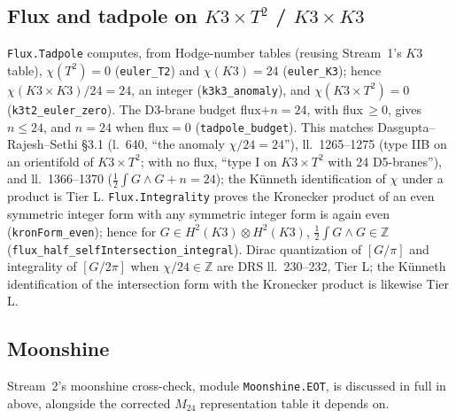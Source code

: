 \documentclass[11pt,a4paper]{article}
\theoremstyle{remark}
\begin{document}
\subsection{Flux and tadpole on \texorpdfstring{$K3\times T^2$}{K3xT2} / \texorpdfstring{$K3\times K3$}{K3xK3}}
\label{sec:stream2-flux}
\texttt{Flux.Tadpole} computes, from Hodge-number tables (reusing Stream~1's $K3$ table),
$\chi(T^2)=0$ (\texttt{euler\_\discretionary{}{}{}T2}) and $\chi(K3)=24$
(\texttt{euler\_\discretionary{}{}{}K3}); hence $\chi(K3\times K3)/24=24$, an integer
(\texttt{k3k3\_\discretionary{}{}{}anomaly}), and $\chi(K3\times T^2)=0$
(\texttt{k3t2\_\discretionary{}{}{}euler\_\discretionary{}{}{}zero}). The D3-brane budget
flux$+n=24$, with flux$\,\ge0$, gives $n\le24$, and $n=24$ when flux$=0$
(\texttt{tadpole\_\discretionary{}{}{}budget}). This matches Dasgupta--Rajesh--Sethi
\cite{DasguptaRajeshSethi1999} \S3.1 (l.~640, ``the anomaly $\chi/24=24$''), ll.~1265--1275 (type
IIB on an orientifold of $K3\times T^2$; with no flux, ``type I on $K3\times T^2$ with 24 D5-branes''),
and ll.~1366--1370 ($\tfrac12\int G\wedge G+n=24$); the Künneth identification of $\chi$ under a
product is Tier L. \texttt{Flux.Integrality} proves the Kronecker product of an even symmetric
integer form with any symmetric integer form is again even
(\texttt{kronForm\_\discretionary{}{}{}even}); hence for $G\in H^2(K3)\otimes H^2(K3)$,
$\tfrac12\int G\wedge G\in\mathbb Z$
(\texttt{flux\_\discretionary{}{}{}half\_\discretionary{}{}{}selfIntersection\_\discretionary{}{}{}integral}).
Dirac quantization of $[G/\pi]$ and integrality of $[G/2\pi]$ when $\chi/24\in\mathbb Z$ are DRS
ll.~230--232, Tier L; the Künneth identification of the intersection form with the Kronecker product
is likewise Tier L.

\subsection{Moonshine}
\label{sec:stream2-moonshine}
Stream~2's moonshine cross-check, module \texttt{Moonshine.EOT}, is discussed in full in
 above, alongside the corrected $M_{24}$ representation table it depends on.
\end{document}
